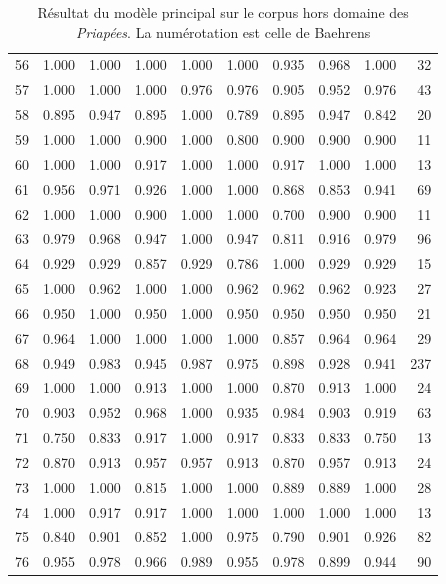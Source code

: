 \begin{table}[]
{\begin{tabular}{lrrrrrrrrr}
    56 &  1.000 & 1.000 & 1.000 &   1.000 &             1.000 & 0.935 & 0.968 & 1.000 &    32 \\
    57 &  1.000 & 1.000 & 1.000 &   0.976 &             0.976 & 0.905 & 0.952 & 0.976 &    43 \\
    58 &  0.895 & 0.947 & 0.895 &   1.000 &             0.789 & 0.895 & 0.947 & 0.842 &    20 \\
    59 &  1.000 & 1.000 & 0.900 &   1.000 &             0.800 & 0.900 & 0.900 & 0.900 &    11 \\
    60 &  1.000 & 1.000 & 0.917 &   1.000 &             1.000 & 0.917 & 1.000 & 1.000 &    13 \\
    61 &  0.956 & 0.971 & 0.926 &   1.000 &             1.000 & 0.868 & 0.853 & 0.941 &    69 \\
    62 &  1.000 & 1.000 & 0.900 &   1.000 &             1.000 & 0.700 & 0.900 & 0.900 &    11 \\
    63 &  0.979 & 0.968 & 0.947 &   1.000 &             0.947 & 0.811 & 0.916 & 0.979 &    96 \\
    64 &  0.929 & 0.929 & 0.857 &   0.929 &             0.786 & 1.000 & 0.929 & 0.929 &    15 \\
    65 &  1.000 & 0.962 & 1.000 &   1.000 &             0.962 & 0.962 & 0.962 & 0.923 &    27 \\
    66 &  0.950 & 1.000 & 0.950 &   1.000 &             0.950 & 0.950 & 0.950 & 0.950 &    21 \\
    67 &  0.964 & 1.000 & 1.000 &   1.000 &             1.000 & 0.857 & 0.964 & 0.964 &    29 \\
    68 &  0.949 & 0.983 & 0.945 &   0.987 &             0.975 & 0.898 & 0.928 & 0.941 &   237 \\
    69 &  1.000 & 1.000 & 0.913 &   1.000 &             1.000 & 0.870 & 0.913 & 1.000 &    24 \\
    70 &  0.903 & 0.952 & 0.968 &   1.000 &             0.935 & 0.984 & 0.903 & 0.919 &    63 \\
    71 &  0.750 & 0.833 & 0.917 &   1.000 &             0.917 & 0.833 & 0.833 & 0.750 &    13 \\
    72 &  0.870 & 0.913 & 0.957 &   0.957 &             0.913 & 0.870 & 0.957 & 0.913 &    24 \\
    73 &  1.000 & 1.000 & 0.815 &   1.000 &             1.000 & 0.889 & 0.889 & 1.000 &    28 \\
    74 &  1.000 & 0.917 & 0.917 &   1.000 &             1.000 & 1.000 & 1.000 & 1.000 &    13 \\
    75 &  0.840 & 0.901 & 0.852 &   1.000 &             0.975 & 0.790 & 0.901 & 0.926 &    82 \\
    76 &  0.955 & 0.978 & 0.966 &   0.989 &             0.955 & 0.978 & 0.899 & 0.944 &    90 \\
    \bottomrule
    \end{tabular}}
    \caption{Résultat du modèle principal sur le corpus hors domaine des \textit{Priapées}. La numérotation est celle de Baehrens}
    \label{tab:priapea_full_results}
\end{table}

